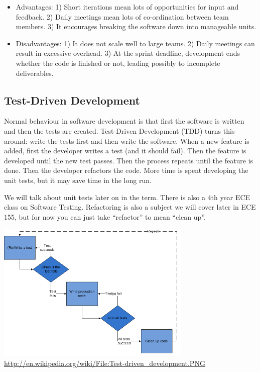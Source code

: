 \begin{itemize}
	\item Advantages: 1) Short iterations mean lots of opportunities for input and feedback. 2) Daily meetings mean lots of co-ordination between team members. 3) It encourages breaking the software down into manageable units.
	\item Disadvantages: 1) It does not scale well to large teams. 2) Daily meetings can result in excessive overhead. 3) At the sprint deadline, development ends whether the code is finished or not, leading possibly to incomplete deliverables.
\end{itemize}

\subsection*{Test-Driven Development}
Normal behaviour in software development is that first the software is written and then the tests are created. Test-Driven Development (TDD) turns this around: write the tests first and then write the software. When a new feature is added, first the developer writes a test (and it should fail). Then the feature is developed until the new test passes. Then the process repeats until the feature is done. Then the developer refactors the code. More time is spent developing the unit tests, but it may save time in the long run. \cite{Beck}

We will talk about unit tests later on in the term. There is also a 4th year ECE class on Software Testing. Refactoring is also a subject we will cover later in ECE 155, but for now you can just take ``refactor'' to mean ``clean up''.

\begin{center}
\includegraphics[width=0.7\textwidth]{images/tdd.png}
\hfill \url{http://en.wikipedia.org/wiki/File:Test-driven_development.PNG}
\end{center}

